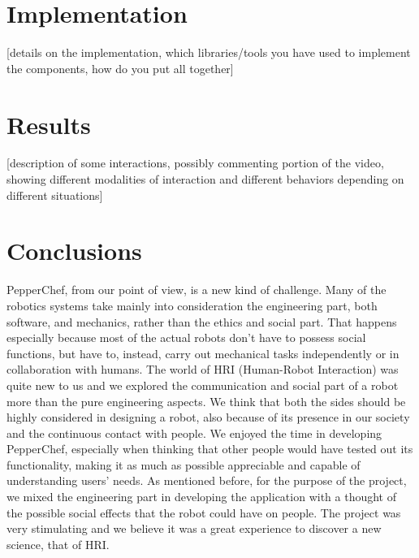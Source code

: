 \documentclass[11pt]{article}
\begin{document}
\newpage
\section{Implementation}\label{cha:impl}

[details on the implementation, which libraries/tools you have used to implement the components, how do you put all together]

\newpage
\section{Results}\label{cha:res}

[description of some interactions, possibly commenting portion of the video, showing different modalities of interaction and different behaviors depending on different situations]

\newpage
\section{Conclusions}\label{cha:conc}

PepperChef, from our point of view, is a new kind of challenge. Many of the robotics systems take mainly into consideration the engineering part, both software, and mechanics, rather than the ethics and social part. That happens especially because most of the actual robots don't have to possess social functions, but have to, instead, carry out mechanical tasks independently or in collaboration with humans. The world of HRI (Human-Robot Interaction) was quite new to us and we explored the communication and social part of a robot more than the pure engineering aspects. We think that both the sides should be highly considered in designing a robot, also because of its presence in our society and the continuous contact with people. We enjoyed the time in developing PepperChef, especially when thinking that other people would have tested out its functionality, making it as much as possible appreciable and capable of understanding users' needs. As mentioned before, for the purpose of the project, we mixed the engineering part in developing the application with a thought of the possible social effects that the robot could have on people. The project was very stimulating and we believe it was a great experience to discover a new science, that of HRI.
\end{document}
